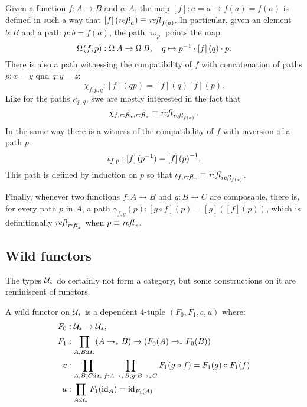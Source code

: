 \documentclass[english,a4]{article}
\renewcommand{\ap}[1]{\left[{#1}\right]}
\newcommand{\ptdto}{\to_\ast}%
\newcommand{\UUptd}{\UU_{\ast}}
\begin{document}
Given a function $f:A\to B$ and $a:A$, the map $\ap f : a=a
\to f(a)=f(a)$ is defined in such a way that $\ap f (\refl a) \jdeq \refl
{f(a)}$. In particular, given an element $b:B$ and a path $p:b=f(a)$, the path
$\varpi_p$ points the map:
\begin{displaymath}
  \loopspace\null (f,p) : \loopspace \null A \to \loopspace\null B, \quad
  q \mapsto \inv p \cdot \ap f(q) \cdot p.
\end{displaymath}
There is also a path witnessing the compatibility of $f$ with concatenation of
paths $p:x=y$ qnd $q:y=z$:
\begin{displaymath}
  \chi_{f,p,q} : \ap f (qp) = \ap f (q) \ap f (p).
\end{displaymath}
Like for the paths $\kappa_{p,q}$, swe are mostly interested in the fact that 
\begin{displaymath}
  \chi_{f,\mathop{{\mathit{refl}}_{x}},\mathop{{\mathit{refl}}_{x}}} \equiv \mathop{{\mathit{refl}}_{\mathop{{\mathit{refl}}_{f(x)}}}}.
\end{displaymath}
In the same way there is a witness of the compatibility of $f$ with inversion of
a path $p$:
\begin{displaymath}
  \iota_{f,p} : \ap f(\inv p) = \inv {\ap f (p)}.
\end{displaymath}
This path is defined by induction on $p$ so that $\iota_{f,\mathop{{\mathit{refl}}_{x}}} \equiv
\mathop{{\mathit{refl}}_{\mathop{{\mathit{refl}}_{f(x)}}}}$.

Finally, whenever two functions $f:A\to B$ and $g:B\to C$ are composable, there
is, for every path $p$ in $A$, a path $\gamma_{f,g}(p) : \ap{g\circ f}(p) = \ap
g (\ap f (p))$, which is definitionally $\mathop{{\mathit{refl}}_{\mathop{{\mathit{refl}}_{x}}}}$ when $p \equiv \mathop{{\mathit{refl}}_{x}}$.



\subsection{Wild functors}
\label{sec:wild-functors}
The types $\UUptd$ do certainly not form a category, but some
constructions on it are reminiscent of functors. 
\begin{definition}
  A wild functor on $\UUptd$ is a dependent $4$-tuple $(F_0,F_1,c,u)$ where:
  \begin{align*}
    F_0 &:\UUptd \to \UUptd,\\
    F_1 &:\prod_{A,B:\UUptd} (A \ptdto B) \to (F_0(A) \ptdto F_0(B))\\
    c &: \prod_{A,B,C:\UUptd}\prod_{f:A\ptdto B, g:B\ptdto C}F_1(g\circ f) = F_1(g) \circ F_1(f)\\
    u &: \prod_{A:\UUptd} F_1(\id_A) = \id_{F_1(A)}
  \end{align*}
  \label{def:wild-functor}
\end{definition}
\end{document}
